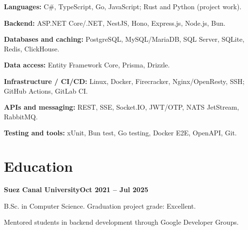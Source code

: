 \documentclass[letterpaper,11pt]{article}
\begin{document}
\textbf{Languages:} C\#, TypeScript, Go, JavaScript; Rust and Python (project work).\par\vspace{3pt}
\textbf{Backend:} ASP.NET Core/.NET, NestJS, Hono, Express.js, Node.js, Bun.\par\vspace{3pt}
\textbf{Databases and caching:} PostgreSQL, MySQL/MariaDB, SQL Server, SQLite, Redis, ClickHouse.\par\vspace{3pt}
\textbf{Data access:} Entity Framework Core, Prisma, Drizzle.\par\vspace{3pt}
\textbf{Infrastructure / CI/CD:} Linux, Docker, Firecracker, Nginx/OpenResty, SSH; GitHub Actions, GitLab CI.\par\vspace{3pt}
\textbf{APIs and messaging:} REST, SSE, Socket.IO, JWT/OTP, NATS JetStream, RabbitMQ.\par\vspace{3pt}
\textbf{Testing and tools:} xUnit, Bun test, Go testing, Docker E2E, OpenAPI, Git.

\section{Education}

\textbf{Suez Canal University}\hfill\textbf{Oct 2021 -- Jul 2025}\par
B.Sc. in Computer Science. Graduation project grade: Excellent.\par
Mentored students in backend development through Google Developer Groups.
\end{document}
